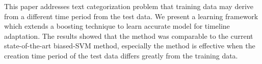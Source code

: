 This paper addresses text categorization problem that training data may derive from a different time period from the test data. We present a learning framework which extends a boosting technique to learn accurate model for timeline adaptation. The results showed that the method was comparable to the current state-of-the-art biased-SVM method, especially the method is effective when the creation time period of the test data differs greatly from the training data.
